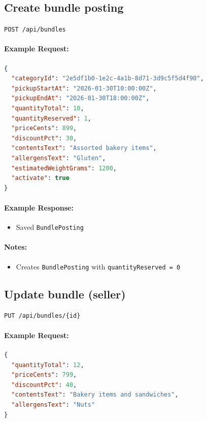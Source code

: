 \documentclass[a4paper,11pt]{article}
\begin{document}
\subsection{Create bundle posting}
\texttt{POST /api/bundles}

\paragraph{Example Request:}
\begin{lstlisting}[language=json]
{
  "categoryId": "2e5df1b0-1e2c-4a1b-8d71-3d9c5f5d4f90",
  "pickupStartAt": "2026-01-30T10:00:00Z",
  "pickupEndAt": "2026-01-30T18:00:00Z",
  "quantityTotal": 10,
  "quantityReserved": 1,
  "priceCents": 899,
  "discountPct": 30,
  "contentsText": "Assorted bakery items",
  "allergensText": "Gluten",
  "estimatedWeightGrams": 1200,
  "activate": true
}
\end{lstlisting}

\paragraph{Example Response:}
\begin{itemize}
    \item Saved \texttt{BundlePosting}
\end{itemize}

\paragraph{Notes:}
\begin{itemize}
    \item Creates \texttt{BundlePosting} with \texttt{quantityReserved = 0}
\end{itemize}

\subsection{Update bundle (seller)}
\texttt{PUT /api/bundles/\{id\}}

\paragraph{Example Request:}
\begin{lstlisting}[language=json]
{
  "quantityTotal": 12,
  "priceCents": 799,
  "discountPct": 40,
  "contentsText": "Bakery items and sandwiches",
  "allergensText": "Nuts"
}
\end{lstlisting}
\end{document}
